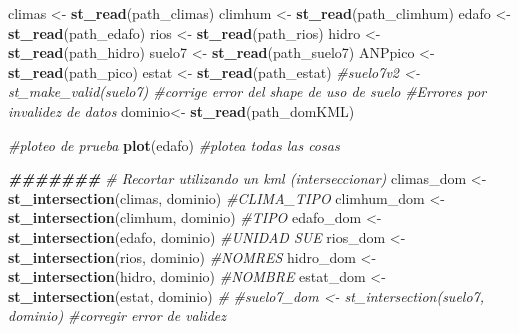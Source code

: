 \documentclass[
  11pt,
  letterpaper,
  DIV=11,
  numbers=noendperiod]{scrartcl}
\newenvironment{Shaded}{\begin{snugshade}}{\end{snugshade}}
\newcommand{\CommentTok}[1]{\textcolor[rgb]{0.56,0.35,0.01}{\textit{#1}}}
\newcommand{\DocumentationTok}[1]{\textcolor[rgb]{0.56,0.35,0.01}{\textbf{\textit{#1}}}}
\newcommand{\FunctionTok}[1]{\textcolor[rgb]{0.13,0.29,0.53}{\textbf{#1}}}
\newcommand{\NormalTok}[1]{#1}
\newcommand{\OtherTok}[1]{\textcolor[rgb]{0.56,0.35,0.01}{#1}}
\begin{document}
\begin{Shaded}
\begin{Highlighting}[numbers=left,,]
\NormalTok{climas }\OtherTok{\textless{}{-}} \FunctionTok{st\_read}\NormalTok{(path\_climas)}
\NormalTok{climhum }\OtherTok{\textless{}{-}} \FunctionTok{st\_read}\NormalTok{(path\_climhum)}
\NormalTok{edafo }\OtherTok{\textless{}{-}} \FunctionTok{st\_read}\NormalTok{(path\_edafo)}
\NormalTok{rios }\OtherTok{\textless{}{-}} \FunctionTok{st\_read}\NormalTok{(path\_rios)}
\NormalTok{hidro }\OtherTok{\textless{}{-}} \FunctionTok{st\_read}\NormalTok{(path\_hidro)}
\NormalTok{suelo7 }\OtherTok{\textless{}{-}} \FunctionTok{st\_read}\NormalTok{(path\_suelo7)}
\NormalTok{ANPpico }\OtherTok{\textless{}{-}} \FunctionTok{st\_read}\NormalTok{(path\_pico)}
\NormalTok{estat }\OtherTok{\textless{}{-}} \FunctionTok{st\_read}\NormalTok{(path\_estat)}
\CommentTok{\#suelo7v2 \textless{}{-} st\_make\_valid(suelo7) \#corrige error del shape de uso de suelo}
\CommentTok{\#Errores por invalidez de datos}
\NormalTok{dominio}\OtherTok{\textless{}{-}} \FunctionTok{st\_read}\NormalTok{(path\_domKML)}

\CommentTok{\#ploteo de prueba}
\FunctionTok{plot}\NormalTok{(edafo) }\CommentTok{\#plotea todas las cosas}

\DocumentationTok{\#\#\#\#\#\#\#}
\CommentTok{\# Recortar utilizando un kml (interseccionar)}
\NormalTok{climas\_dom }\OtherTok{\textless{}{-}} \FunctionTok{st\_intersection}\NormalTok{(climas, dominio) }\CommentTok{\#CLIMA\_TIPO}
\NormalTok{climhum\_dom }\OtherTok{\textless{}{-}} \FunctionTok{st\_intersection}\NormalTok{(climhum, dominio) }\CommentTok{\#TIPO}
\NormalTok{edafo\_dom }\OtherTok{\textless{}{-}} \FunctionTok{st\_intersection}\NormalTok{(edafo, dominio) }\CommentTok{\#UNIDAD SUE}
\NormalTok{rios\_dom }\OtherTok{\textless{}{-}} \FunctionTok{st\_intersection}\NormalTok{(rios, dominio) }\CommentTok{\#NOMRES}
\NormalTok{hidro\_dom }\OtherTok{\textless{}{-}} \FunctionTok{st\_intersection}\NormalTok{(hidro, dominio) }\CommentTok{\#NOMBRE}
\NormalTok{estat\_dom }\OtherTok{\textless{}{-}} \FunctionTok{st\_intersection}\NormalTok{(estat, dominio) }\CommentTok{\#}
\CommentTok{\#suelo7\_dom \textless{}{-} st\_intersection(suelo7, dominio) \#corregir error de validez}


\end{Highlighting}
\end{Shaded}
\end{document}
